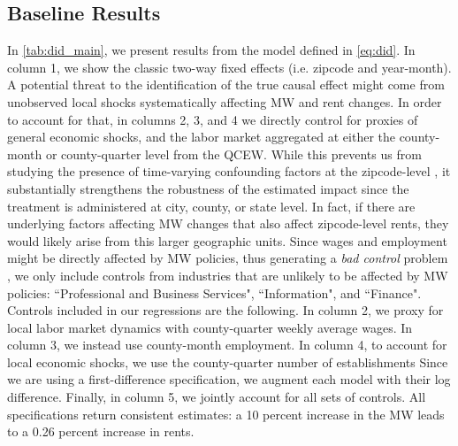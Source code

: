 \subsection{Baseline Results}\label{sec:baseline_results}

In \autoref{tab:did_main}, we present results from the model defined in \autoref{eq:did}. In 
column 1, we show the classic two-way fixed effects (i.e. zipcode and year-month). A potential threat 
to the identification of the true causal effect might come from unobserved local shocks 
systematically affecting MW and rent changes. In order to account for that, in columns 2, 3, and 4 
we directly control for proxies of general economic shocks, and the labor market aggregated at 
either the county-month or county-quarter level from the QCEW. While this prevents us from 
studying the presence of time-varying confounding factors at the zipcode-level , it substantially strengthens 
the robustness of the estimated impact since the treatment is administered at city, county, or state 
level. In fact, if there are underlying factors affecting MW changes that also affect zipcode-level 
rents, they would likely arise from this larger geographic units. Since wages and employment might 
be directly affected by MW policies, thus generating a \textit{bad control} problem \parencite{angrist2008mostly},  
we only include controls from industries that are unlikely to be affected by MW policies: 
``Professional and Business Services", ``Information", and ``Finance". 
Controls included in our regressions are the following. In column 2, we proxy for local labor market 
dynamics with county-quarter weekly average wages. In column 3, we instead use county-month employment. 
In column 4, to account for local economic shocks, we use the county-quarter number of establishments 
Since we are using a first-difference specification, we augment each model with their log difference.
Finally, in column 5, we jointly account for all sets of controls. All specifications return consistent estimates: 
a 10 percent increase in the MW leads to a 0.26 percent increase in rents. 


